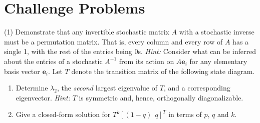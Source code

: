\section{Challenge Problems}

\begin{tasks}[resume, style=enumerate](1)
\task
  Demonstrate that any invertible stochastic matrix $A$ with a
  stochastic inverse must be a permutation matrix.  That is, every
  column and every row of $A$ has a single 1, with the rest of the
  entries being 0s.  \textit{Hint:} Consider what can be inferred
  about the entries of a stochastic $A^{-1}$ from its action on $A
  \mathbf{e}_i$ for any elementary basis vector $\mathbf{e}_i$.
\task
 Let $T$ denote the transition matrix of the following state diagram.
  \begin{center}
  \end{center}
  \begin{enumerate}[label=(\alph*)]
  \item
    Determine $\lambda_2$, the \textit{second} largest eigenvalue of
    $T$, and a corresponding eigenvector. \textit{Hint:}  $T$ is
    symmetric and, hence, orthogonally diagonalizable.\footnotemark
  \item
    Give a closed-form solution for $T^k [(1-q) \ \ q]^T$ in terms
    of $p$, $q$ and $k$.
  \end{enumerate}
\end{tasks}
